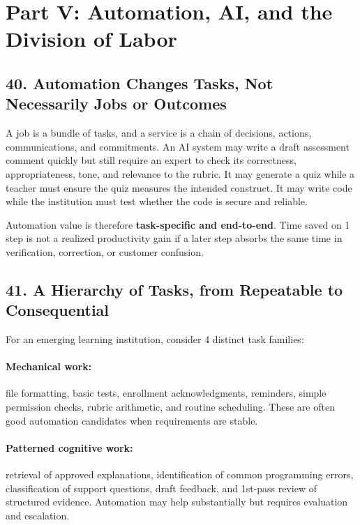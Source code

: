 \section*{Part V: Automation, AI, and the Division of Labor}

\subsection*{40. Automation Changes Tasks, Not Necessarily Jobs or Outcomes}

A job is a bundle of tasks, and a service is a chain of decisions, actions, communications, and commitments. An AI system may write a draft assessment comment quickly but still require an expert to check its correctness, appropriateness, tone, and relevance to the rubric. It may generate a quiz while a teacher must ensure the quiz measures the intended construct. It may write code while the institution must test whether the code is secure and reliable.

Automation value is therefore \textbf{task-specific and end-to-end}. Time saved on 1 step is not a realized productivity gain if a later step absorbs the same time in verification, correction, or customer confusion.

\subsection*{41. A Hierarchy of Tasks, from Repeatable to Consequential}

For an emerging learning institution, consider 4 distinct task families:

\paragraph*{Mechanical work:} file formatting, basic tests, enrollment acknowledgments, reminders, simple permission checks, rubric arithmetic, and routine scheduling. These are often good automation candidates when requirements are stable.

\paragraph*{Patterned cognitive work:} retrieval of approved explanations, identification of common programming errors, classification of support questions, draft feedback, and 1st-pass review of structured evidence. Automation may help substantially but requires evaluation and escalation.


